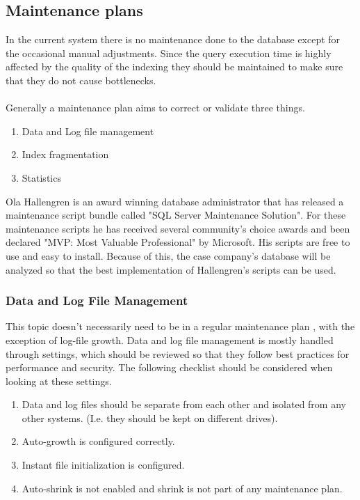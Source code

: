 \documentclass{cslthse-msc}
\begin{document}
\subsection{Maintenance plans}
In the current system there is no maintenance done to the database except for the occasional manual adjustments. Since the query execution time is highly affected by the quality of the indexing they should be maintained to make sure that they do not cause bottlenecks. \\\\
Generally a maintenance plan aims to correct or validate three things.
\begin{enumerate}
\item Data and Log file management
\item Index fragmentation
\item Statistics
\end{enumerate}

\noindent Ola Hallengren \cite{Hallengren15} is an award winning database administrator that has released a maintenance script bundle called "SQL Server Maintenance Solution". For these maintenance scripts he has received several community's choice awards and been declared "MVP: Most Valuable Professional" by Microsoft. His scripts are free to use and easy to install. Because of this, the case company's database will be analyzed so that the best implementation of Hallengren's scripts can be used.

\subsubsection{Data and Log File Management}
This topic doesn't necessarily need to be in a regular maintenance plan \cite{Randal08}, with the exception of log-file growth. Data and log file management is mostly handled through settings, which should be reviewed so that they follow best practices for performance and security. The following checklist should be considered when looking at these settings.

\begin{enumerate}
\item Data and log files should be separate from each other and isolated from any other systems. (I.e. they should be kept on different drives).
\item Auto-growth is configured correctly.
\item Instant file initialization is configured.
\item Auto-shrink is not enabled and shrink is not part of any maintenance plan.
\end{enumerate}
\end{document}

